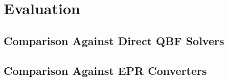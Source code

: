 \chapter{Evaluation}

\section{Comparison Against Direct QBF Solvers}

\section{Comparison Against EPR Converters}
